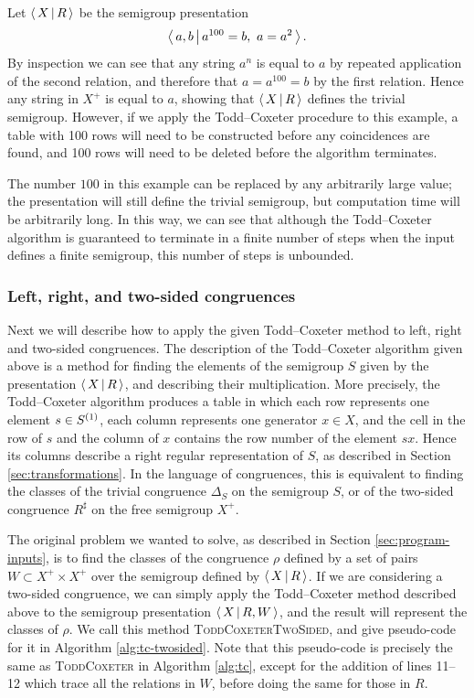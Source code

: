 \begin{example}
  \label{ex:tc-long}
  Let $\left\langle \, X \, \middle| \, R \, \right\rangle$ be the semigroup presentation
  $$\left\langle \, a,b \, \middle| \, a^{100}=b,\ a=a^2 \, \right\rangle.$$
  By inspection we can see that any string $a^n$ is equal to $a$ by repeated
  application of the second relation, and therefore that $a = a^{100} = b$ by
  the first relation.  Hence any string in $X^+$ is equal to $a$, showing that
  $\left\langle \, X \, \middle| \, R \, \right\rangle$ defines the trivial
  semigroup.  However, if we apply the Todd--Coxeter procedure to this example,
  a table with 100 rows will need to be constructed before any coincidences are
  found, and 100 rows will need to be deleted before the algorithm terminates.

  The number $100$ in this example can be replaced by
  any arbitrarily large value; the presentation will still define the
  trivial semigroup, but computation time will be arbitrarily long.
  In this way, we can see that although the Todd--Coxeter algorithm is guaranteed
  to terminate in a finite number of steps when the input defines a finite
  semigroup, this number of steps is unbounded.
\end{example}

\subsubsection{Left, right, and two-sided congruences}
\label{sec:tc-l-r}
Next we will describe how to apply the given Todd--Coxeter method to
left, right and two-sided congruences.  The description of the Todd--Coxeter algorithm given
above is a method for finding the elements of the semigroup $S$ given by the
presentation $\left\langle \, X \, \middle| \, R \, \right\rangle$, and describing their multiplication.  More precisely,
the Todd--Coxeter algorithm produces a table in which each row represents one element
$s \in S^{(1)}{}$, each column represents one generator $x \in X$, and the cell in the
row of $s$ and the column of $x$ contains the row number of the element $sx$.
Hence its columns describe a right regular representation of $S$, as described
in Section \ref{sec:transformations}.  In the language of congruences, this is
equivalent to finding the classes of the trivial congruence $\Delta_S$ on the
semigroup $S$, or of the two-sided congruence $R^\sharp$ on the free semigroup
$X^+$.

The original problem we wanted to solve, as described in Section
\ref{sec:program-inputs}, is to find the classes of the congruence $\rho$
defined by a set of pairs $W \subset X^+ \times X^+$ over the semigroup defined
by $\left\langle \, X \, \middle| \, R \, \right\rangle$.  If we are considering
a two-sided congruence, we can simply apply the Todd--Coxeter method described
above to the semigroup presentation $\left\langle \, X \, \middle| \, R,W \, \right\rangle$, and the result will represent the
classes of $\rho$.  We call this method \textsc{ToddCoxeterTwoSided}, and give
pseudo-code for it in Algorithm \ref{alg:tc-twosided}.  Note that this
pseudo-code is precisely the same as \textsc{ToddCoxeter} in Algorithm
\ref{alg:tc}, except for the addition of lines 11--12 which trace all the
relations in $W$, before doing the same for those in $R$.

